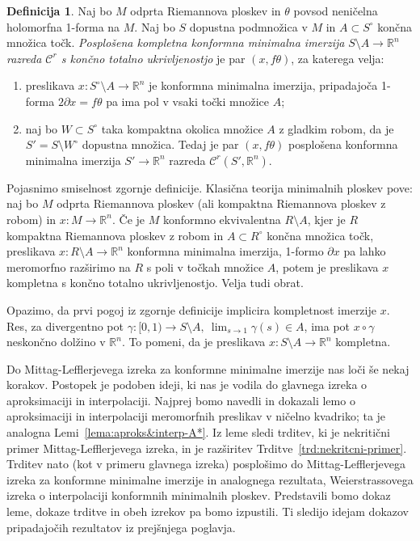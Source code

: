 \documentclass[12pt,a4paper,twoside]{article}
\theoremstyle{definition} %
\newtheorem{definicija}{Definicija}[section]
\theoremstyle{plain} %
\numberwithin{equation}{section}  %
\newcommand{\R}{\mathbb R}
\begin{document}
\begin{definicija} \label{def:GCCMI-FTC}
Naj bo $M$ odprta Riemannova ploskev in $\theta$ povsod neničelna holomorfna 1-forma na $M$. Naj bo $S$ dopustna podmnožica v $M$ in $A \subset S^{\circ}$ končna množica točk. \emph{Posplošena kompletna konformna minimalna imerzija} $S \setminus A \to \mathbb{R}^{n}$ \emph{razreda $\mathcal{C}^{r}$ s končno totalno ukrivljenostjo} je par $(x, f\theta)$, za katerega velja:
\begin{enumerate}
\item preslikava $x \colon S^{\circ} \setminus A \to \mathbb{R}^{n}$ je konformna minimalna imerzija, pripadajoča 1-forma
	$2 \partial x = f\theta$ pa ima pol v vsaki točki množice $A$;
\item naj bo $W \subset S^{\circ}$ taka kompaktna okolica množice $A$ z gladkim robom, da je $S' = S \setminus W^{\circ}$ dopustna množica. Tedaj je par
	$(x, f\theta)$ posplošena konformna minimalna imerzija $S' \to \mathbb{R}^{n}$ razreda $\mathcal{C}^{r}(S', \mathbb{R}^{n})$.
\end{enumerate}
\end{definicija}

Pojasnimo smiselnost zgornje definicije. Klasična teorija minimalnih ploskev pove:
naj bo $M$ odprta Riemannova ploskev (ali kompaktna Riemannova ploskev z robom) in $x \colon M \to \R^{n}$.
Če je $M$ konformno ekvivalentna $R \setminus A$, kjer je $R$ kompaktna Riemannova ploskev z robom in $A \subset R^{\circ}$ končna množica točk, preslikava $x \colon R \setminus A \to \R^{n}$ konformna minimalna imerzija, 1-formo $\partial x$ pa lahko meromorfno razširimo na $R$ s poli v točkah množice $A$, potem je preslikava $x$ kompletna s končno totalno ukrivljenostjo.
Velja tudi obrat.

Opazimo, da prvi pogoj iz zgornje definicije implicira kompletnost imerzije $x$. Res, za divergentno pot $\gamma \colon [0,1) \to S \setminus A, \ \lim_{s \to 1}\gamma(s) \in A$, ima pot $x \circ \gamma$ neskončno dolžino v $\R^{n}$. To pomeni, da je preslikava $x \colon S \setminus A \to \R^{n}$ kompletna. \newline

Do Mittag-Lefflerjevega izreka za konformne minimalne imerzije nas loči še nekaj korakov. Postopek je podoben ideji, ki nas je vodila do glavnega izreka o aproksimaciji in interpolaciji. Najprej bomo navedli in dokazali lemo o aproksimaciji in interpolaciji meromorfnih preslikav v ničelno kvadriko; ta je analogna Lemi~\ref{lema:aproks&interp-A*}.
Iz leme sledi trditev, ki je nekritični primer Mittag-Lefflerjevega izreka, in je razširitev Trditve~\ref{trd:nekritcni-primer}.
Trditev nato (kot v primeru glavnega izreka) posplošimo do Mittag-Lefflerjevega izreka za konformne minimalne imerzije in analognega rezultata, Weierstrassovega izreka o interpolaciji konformnih minimalnih ploskev.
Predstavili bomo dokaz leme, dokaze trditve in obeh izrekov pa bomo izpustili. Ti sledijo idejam dokazov pripadajočih rezultatov iz prejšnjega poglavja.
\end{document}
